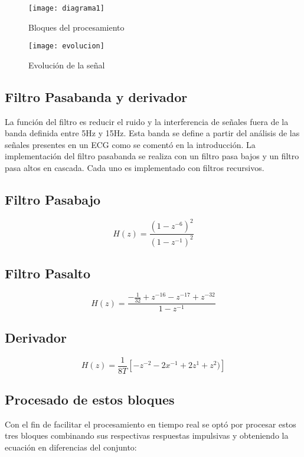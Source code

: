 \documentclass[%
        final,
        notitlepage,
        narroweqnarray,
        inline,
        ]{ieee}
\numberwithin{equation}{section}
\numberwithin{figure}{section}
\numberwithin{table}{section}
\begin{document}
\begin{figure}
	\centering
	\texttt{[image: diagrama1]}
	\caption{Bloques del procesamiento}
	\label{fig:pasos}
\end{figure}

\begin{figure}
	\centering
	\texttt{[image: evolucion]}
	\caption{Evolución de la señal}
	\label{fig:evolucion}
\end{figure}

\subsection{Filtro Pasabanda y derivador}

La función del filtro es reducir el ruido y la interferencia de señales fuera de la
banda definida entre 5Hz y 15Hz. Esta banda se define a partir del análisis de
las señales presentes en un ECG como se comentó en la introducción.
La implementación del filtro pasabanda se realiza con un filtro pasa bajos y un filtro pasa
altos en cascada. Cada uno es implementado con filtros recursivos.

\subsection*{Filtro Pasabajo}
\begin{equation}
H(z) = \frac{(1-z^{-6})^{2}}{(1-z^{-1})^{2}}
\end{equation}

\subsection*{Filtro Pasalto}
\begin{equation}
H(z) = \frac{-\frac{1}{32} + z^{-16} - z^{-17} + z^{-32}}{1-z^{-1}}
\end{equation}

\subsection*{Derivador}
\begin{equation}
H(z) =  \frac{1}{8T}[ - z^{-2} - 2x^{-1} + 2z^1 + z^2)]
\end{equation}

\subsection{Procesado de estos bloques}
Con el fin de facilitar el procesamiento en tiempo real se optó por procesar estos tres bloques combinando sus respectivas respuestas impulsivas y obteniendo la ecuación en diferencias del conjunto:
\end{document}

